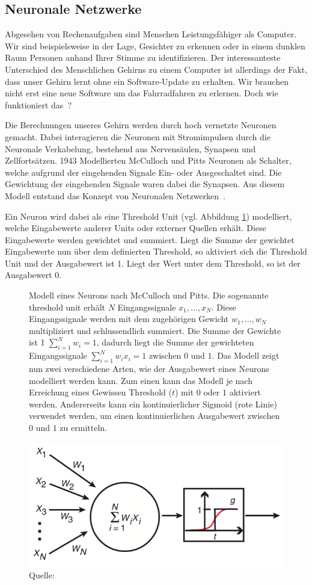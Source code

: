 \subsection{Neuronale Netzwerke}

Abgesehen von Rechenaufgaben sind Menschen Leistungsfähiger als Computer. Wir sind beispielsweise in der Lage, Gesichter zu erkennen oder in einem dunklen Raum Personen anhand Ihrer Stimme zu identifizieren. Der interessanteste Unterschied des Menschlichen Gehirns zu einem Computer ist allerdings der Fakt, dass unser Gehirn lernt ohne ein Software-Update zu erhalten. Wir brauchen nicht erst eine neue Software um das Fahrradfahren zu erlernen. Doch wie funktioniert das~\autocite{Krogh2008}?

Die Berechnungen unseres Gehirn werden durch hoch vernetzte Neuronen gemacht. Dabei interagieren die Neuronen mit Stromimpulsen durch die Neuronale Verkabelung, bestehend aus Nervensäulen, Synapsen und Zellfortsätzen. 1943 Modellierten McCulloch und Pitts Neuronen als Schalter, welche aufgrund der eingehenden Signale Ein- oder Ausgeschaltet sind. Die Gewichtung der eingehenden Signale waren dabei die Synapsen. Aus diesem Modell entstand das Konzept von Neuronalen Netzwerken~\autocite{Krogh2008}.

Ein Neuron wird dabei als eine Threshold Unit (vgl. Abbildung \ref{krogh:a}) modelliert, welche Eingabewerte anderer Units oder externer Quellen erhält. Diese Eingabewerte werden gewichtet und summiert. Liegt die Summe der gewichtet Eingabewerte nun über dem definierten Threshold, so aktiviert sich die Threshold Unit und der Ausgabewert ist 1. Liegt der Wert unter dem Threshold, so ist der Ausgabewert 0.

\begin{figure}[h]
    \captionsetup{width=.9\linewidth}
    \caption{Modell eines Neurons nach McCulloch und Pitts. Die sogenannte threshold unit erhält $N$ Eingangssignale $x_1, ..., x_N$. Diese Eingangssignale werden mit dem zugehörigen Gewicht $w_1, ..., w_N$ multipliziert und schlussendlich summiert. Die Summe der Gewichte ist 1 $\sum_{i=1}^{N} w_i = 1$, dadurch liegt die Summe der gewichteten Eingangssignale $\sum_{i=1}^{N} w_i x_i = 1$ zwischen $0$ und $1$. Das Modell zeigt nun zwei verschiedene Arten, wie der Ausgabewert eines Neurons modelliert werden kann. Zum einen kann das Modell je nach Erreichung eines Gewissen Threshold ($t$) mit $0$ oder $1$ aktiviert werden. Andererseits kann ein kontinuierlicher Sigmoid (rote Linie) verwendet werden, um einen kontinuierlichen Ausgabewert zwischen $0$ und $1$ zu ermitteln.}
    \label{krogh:a}
    \centering
    \includegraphics[width=0.5\linewidth]{graphics/krogh/krogh_neural-network.png}
    \caption*{Quelle: \textcite{Krogh2008}}
\end{figure}

